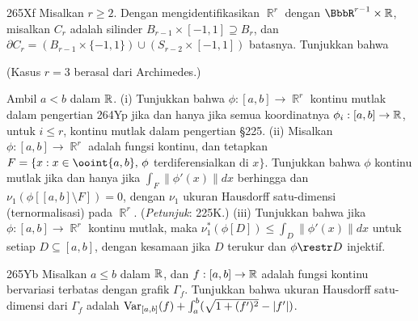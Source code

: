 {\spheader 265Xf Misalkan $r\ge 2$. Dengan
mengidentifikasikan $\BbbR^r$ dengan $\BbbR^{r-1}\times\Bbb R$,
misalkan $C_r$ adalah silinder
$B_{r-1}\times[-1,1]\supseteq B_r$, dan
$\partial C_r=(B_{r-1}\times\{-1,1\})\cup(S_{r-2}\times[-1,1])$
batasnya. Tunjukkan bahwa


\noindent(Kasus $r=3$ berasal dari Archimedes.)

Ambil $a<b$ dalam $\Bbb R$. (i) Tunjukkan bahwa
$\phi:[a,b]\to\BbbR^r$ kontinu mutlak dalam pengertian 264Yp jika dan
hanya jika semua koordinatnya $\phi_i:[a,b]\to\Bbb R$, untuk $i\le r$,
kontinu mutlak dalam pengertian \S225. (ii) Misalkan
$\phi:[a,b]\to\BbbR^r$ adalah fungsi kontinu, dan tetapkan
$F=\{x:x\in\ooint{a,b},\,\phi$ terdiferensialkan di $x\}$. Tunjukkan
bahwa $\phi$ kontinu mutlak jika dan hanya jika
$\int_F\|\phi'(x)\|dx$ berhingga dan
$\nu_1(\phi[[a,b]\setminus F])=0$, dengan $\nu_1$ ukuran Hausdorff
satu-dimensi (ternormalisasi) pada $\BbbR^r$. ({\it Petunjuk\/}:
225K.) (iii) Tunjukkan bahwa jika $\phi:[a,b]\to\BbbR^r$ kontinu
mutlak, maka $\nu_1^*(\phi[D])\le\int_D\|\phi'(x)\|dx$ untuk setiap
$D\subseteq[a,b]$, dengan kesamaan jika $D$ terukur dan
$\phi\restr D$ injektif.

\spheader 265Yb Misalkan $a\le b$ dalam $\Bbb R$, dan
$f:[a,b]\to\Bbb R$ adalah fungsi kontinu bervariasi terbatas dengan
grafik $\Gamma_f$. Tunjukkan bahwa ukuran Hausdorff satu-dimensi dari
$\Gamma_f$ adalah
$\mathop{\text{Var}}_{[a,b]}(f)+\int_a^b(\sqrt{1+(f')^2}-|f'|)$.
}%

